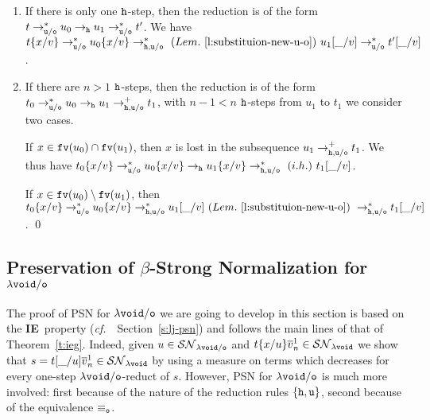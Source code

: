 \documentclass{LMCS}
\newcommand{\cf}{{\it  cf.}~}
\renewcommand{\>}{\rightarrow}
\def\lam{\lambda}
\newcommand{\Rew}[1]{\rightarrow_{#1}}
\newcommand{\Rewnmod}[2]{\rightarrow^*_{#1/#2}}
\newcommand{\Rewplusmod}[2]{\rightarrow^+_{#1/#2}}
\newcommand{\isubs}[1]{ \{ #1  \} }
\newcommand{\SN}[1]{\mathcal{SN}_{#1}}
\newcommand{\fv}[1]{{\tt fv}(#1)}
\newcommand{\set}[1]{ \{ #1 \}}
\newcommand{\ih}{i.h.}
\newcommand{\iep}{{\bf IE}}
\newcommand{\unboxed}{{\tt u}}
\newcommand{\modulo}[2]{#1/#2}
\newcommand{\ovl}[3]{\overline{#1}^{#2}_{#3}}
\newcommand{\eqo}{\equiv_\osym}
\newcommand{\osym}{{\tt o}}
\newcommand{\osymb}{{\tt o}}
\newcommand{\aux}{{\tt void}}
\newcommand{\laux}{\lam\aux}
\newcommand{\lauxm}{\lam\modulo{ \aux }{ \osymb }}
\newcommand{\New}{{\tt h}}
\newcommand{\void}{\_}
\begin{document}
\begin{enumerate}[$\bullet$] 
\item If there is only one $\New$-step, then the reduction is of the form $t
  \Rewnmod{\unboxed}{\osym} u_0 \Rew{\New} u_1
  \Rewnmod{\unboxed}{\osym} t'$.  We have $t\isubs{x/v}
  \Rewnmod{\unboxed}{\osym} u_0\isubs{x/v}
  \Rewnmod{\New, \unboxed}{\osym}\ (Lem.~\ref{l:substituion-new-u-o})\
  u_1[\void/v] \Rewnmod{\unboxed}{\osym} t'[\void/v]$.
\item If there are $n> 1$ $\New$-steps, then the reduction is of the
  form $t_0 \Rewnmod{\unboxed}{\osym} u_0 \Rew{\New} u_1
  \Rewplusmod{\New,\unboxed}{\osym} t_1$, with $n-1<n$ $\New$-steps from $u_1$ to
  $t_1$ we consider two cases. 


If $x \in \fv{u_0}\cap\fv{u_1}$, then $x$ is lost in the subsequence 
$u_1
  \Rewplusmod{\New,\unboxed}{\osym} t_1$. We thus have
$t_0\isubs{x/v} \Rewnmod{\unboxed}{\osym} u_0\isubs{x/v} \Rew{\New} u_1\isubs{x/v}
  \Rewnmod{\New,\unboxed}{\osym}\ (\ih)\ t_1[\void/v]$.

If $x \in \fv{u_0}\setminus\fv{u_1}$, then
$t_0\isubs{x/v} \Rewnmod{\unboxed}{\osym} u_0\isubs{x/v}  
\Rewnmod{\New,\unboxed}{\osym} u_1[\void/v]\ (Lem.~\ref{l:substituion-new-u-o})\
\Rewnmod{\New,\unboxed}{\osym} t_1[\void/v]$.
\qed
\end{enumerate}

\subsection{Preservation of $\beta$-Strong Normalization for $\lauxm$ }
\label{s:iep-for-lauxm}

The proof of PSN for $\lauxm$ we are going to develop in this
section is based on the \iep\ property (\cf\ Section~\ref{s:lj-psn}) and follows the main lines of
that of Theorem~\ref{t:ieg}.  
Indeed, given $u \in \SN{\lauxm}$ and
$t\isubs{x/u} \ovl{v}{1}{n} \in \SN{\laux}$ we show that
$s=t[\void/u] \ovl{v}{1}{n} \in \SN{\laux}$ by using a measure on terms
which decreases for every  one-step $\lauxm$-reduct of $s$.
However, 
PSN for $\lauxm$ is much more involved: first because of the nature of the reduction rules $\set{\New, \unboxed}$, 
second because of the equivalence $\eqo$. 
\end{document}
